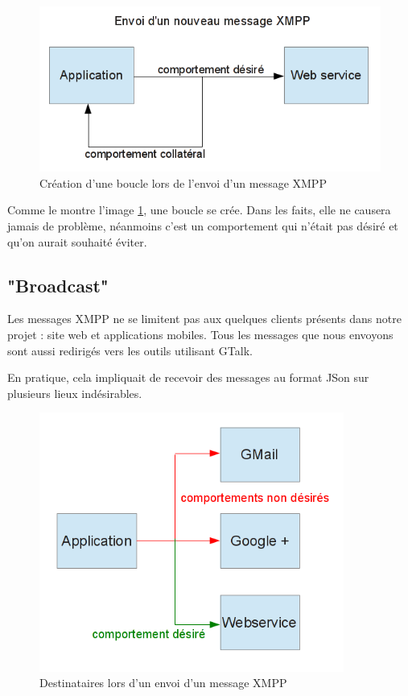 \begin{figure}[!h]
	\center
	\includegraphics[width=12cm]{img/boucle-envoi-xmpp.png}
	\caption{Création d'une boucle lors de l'envoi d'un message XMPP}
	\label{boucle-envoi-xmpp}
\end{figure}

Comme le montre l'image \ref{boucle-envoi-xmpp}, une boucle se crée.
Dans les faits, elle ne causera jamais de problème, néanmoins c'est un comportement qui n'était pas désiré et qu'on aurait souhaité éviter.




\subsection{"Broadcast"}

Les messages XMPP ne se limitent pas aux quelques clients présents dans notre projet : site web et applications mobiles.
Tous les messages que nous envoyons sont aussi redirigés vers les outils utilisant GTalk.

En pratique, cela impliquait de recevoir des messages au format JSon sur plusieurs lieux indésirables.

\begin{figure}[!h]
	\center
	\includegraphics[width=10cm]{img/broadcast-xmpp.png}
	\caption{Destinataires lors d'un envoi d'un message XMPP}
	\label{broadcast-xmpp}
\end{figure}

